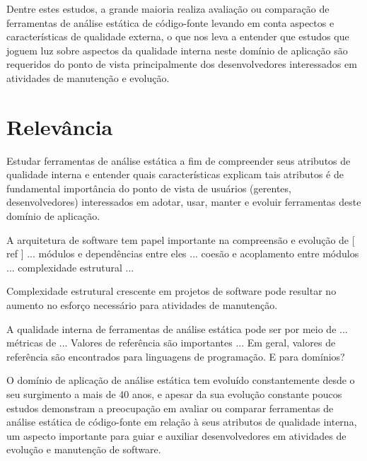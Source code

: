 Dentre estes estudos, a grande maioria realiza avaliação ou comparação de
ferramentas de análise estática de código-fonte levando em conta aspectos e
características de qualidade externa, o que nos leva a entender que estudos
que joguem luz sobre aspectos da qualidade interna neste domínio de aplicação
são requeridos do ponto de vista principalmente dos desenvolvedores
interessados em atividades de manutenção e evolução.

\section{Relevância}

Estudar ferramentas de análise estática a fim de compreender seus atributos de
qualidade interna e entender quais características %
explicam tais atributos é de fundamental importância do 
ponto de vista de usuários (gerentes, desenvolvedores) interessados
em adotar, usar, manter e evoluir ferramentas deste domínio de aplicação.

A arquitetura de software tem papel importante na compreensão e evolução 
de [ ref ] ...
módulos e dependências entre eles ... coesão e acoplamento entre módulos ...
complexidade estrutural ...
 
Complexidade estrutural crescente em projetos de software pode resultar
no aumento no esforço necessário para atividades de manutenção.

A qualidade interna de ferramentas de análise estática pode ser 
por meio de ... métricas de ... 
Valores de referência são importantes ...
Em geral, valores de referência são encontrados para linguagens de programação.
E para domínios?


O domínio de aplicação de análise estática tem evoluído constantemente desde o
seu surgimento a mais de 40 anos, e apesar da sua evolução constante poucos
estudos demonstram a preocupação em avaliar ou comparar ferramentas de análise
estática de código-fonte em relação à seus atributos de qualidade interna, um
aspecto importante para guiar e auxiliar desenvolvedores em atividades de
evolução e manutenção de software.

